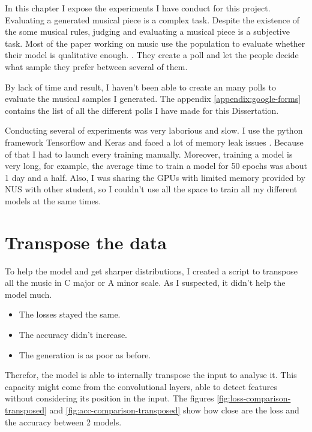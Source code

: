 \documentclass[12pt]{report}
\begin{document}





In this chapter I expose the experiments I have conduct for this project.
Evaluating a generated musical piece is a complex task.
Despite the existence of the some musical rules, judging and evaluating a musical piece is a subjective task.
Most of the paper working on music use the population to evaluate whether their model is qualitative enough. \cite{huang_counterpoint_2017, hadjeres_deepbach:_2016, huang_music_2018, liang_automatic_2017, huang_bach_2019}.
They create a poll and let the people decide what sample they prefer between several of them.

By lack of time and result, I haven't been able to create an many polls to evaluate the musical samples I generated.
The appendix \ref{appendix:google-forms} contains the list of all the different polls I have made for this Dissertation.

Conducting several of experiments was very laborious and slow.
I use the python framework Tensorflow \cite{noauthor_tensorflow_nodate} and Keras \cite{noauthor_keras_nodate} and faced a lot of memory leak issues \cite{noauthor_memory_nodate-1, noauthor_memory_nodate-2}.
Because of that I had to launch every training manually.
Moreover, training a model is very long, for example, the average time to train a model for 50 epochs was about 1 day and a half.
Also, I was sharing the GPUs with limited memory provided by NUS with other student, so I couldn't use all the space to train all my different models at the same times.

\section{Transpose the data}

To help the model and get sharper distributions, I created a script to transpose all the music in C major or A minor scale.
As I suspected, it didn't help the model much.
\begin{itemize}
    \item The losses stayed the same.
    \item The accuracy didn't increase.
    \item The generation is as poor as before.
\end{itemize}
Therefor, the model is able to internally transpose the input to analyse it.
This capacity might come from the convolutional layers, able to detect features without considering its position in the input.
The figures \ref{fig:loss-comparison-transposed} and \ref{fig:acc-comparison-transposed} show how close are the loss and the accuracy between 2 models.
\end{document}

